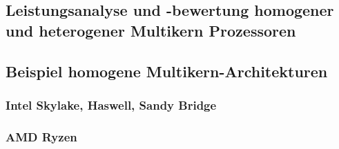 \subsection{Leistungsanalyse und -bewertung homogener und heterogener Multikern Prozessoren}
\subsection{Beispiel homogene Multikern-Architekturen}
\subsubsection{Intel Skylake, Haswell, Sandy Bridge}
\subsubsection{ AMD Ryzen}
